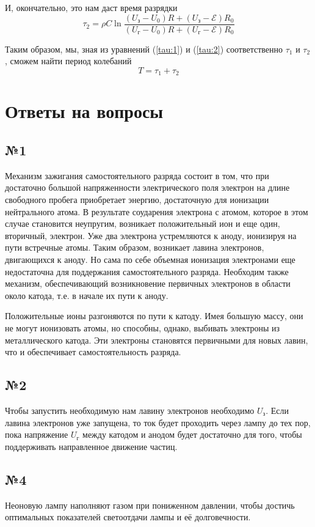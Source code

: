 И, окончательно, это нам даст время разрядки 
\begin{equation}
\label{tau:2}
	\tau_2 =  \rho C \ln { 
	\frac{(U_{\text{з}}  -  U_0) R+ (U_{\text{з}}-\mathcal{E})R_0}
	{(U_{\text{г}}  -  U_0) R+ (U_{\text{г}}-\mathcal{E})R_0}
	}
\end{equation}

Таким образом, мы, зная из уравнений (\ref{tau:1}) и (\ref{tau:2}) соответственно $\tau_1$ и $\tau_2$, сможем найти период колебаний
\begin{equation}
T=\tau_1+\tau_2
\end{equation}
\newpage
\section{Ответы на вопросы}
\subsection{№1}
Механизм зажигания самостоятельного разряда состоит в том, что при достаточно большой напряженности электрического поля электрон на длине свободного пробега приобретает энергию, достаточную для ионизации нейтрального атома. В результате соударения электрона с атомом, которое в этом случае становится неупругим, возникает положительный ион и еще один, вторичный, электрон. Уже два электрона устремляются к аноду, ионизируя на пути встречные атомы. Таким образом, возникает лавина электронов, двигающихся к аноду. Но сама по себе объемная ионизация электронами еще недостаточна для поддержания самостоятельного разряда. Необходим также механизм, обеспечивающий возникновение первичных электронов в области около катода, т.е. в начале их пути к аноду. 

Положительные ионы разгоняются по пути к катоду. Имея большую массу, они не могут ионизовать атомы, но способны, однако, выбивать электроны из металлического катода. Эти электроны становятся первичными для новых лавин, что и обеспечивает самостоятельность разряда.

\subsection{№2}
Чтобы запустить необходимую нам лавину электронов необходимо $U_{\text{з}}$. Если лавина электронов уже запущена, то ток будет проходить через лампу до тех пор, пока напряжение $U_{\text{г}}$ между катодом и анодом будет достаточно для того, чтобы поддерживать направленное движение частиц. 
\subsection{№4}
Неоновую лампу наполняют газом при пониженном давлении, чтобы достичь оптимальных показателей светоотдачи лампы и её долговечности.

